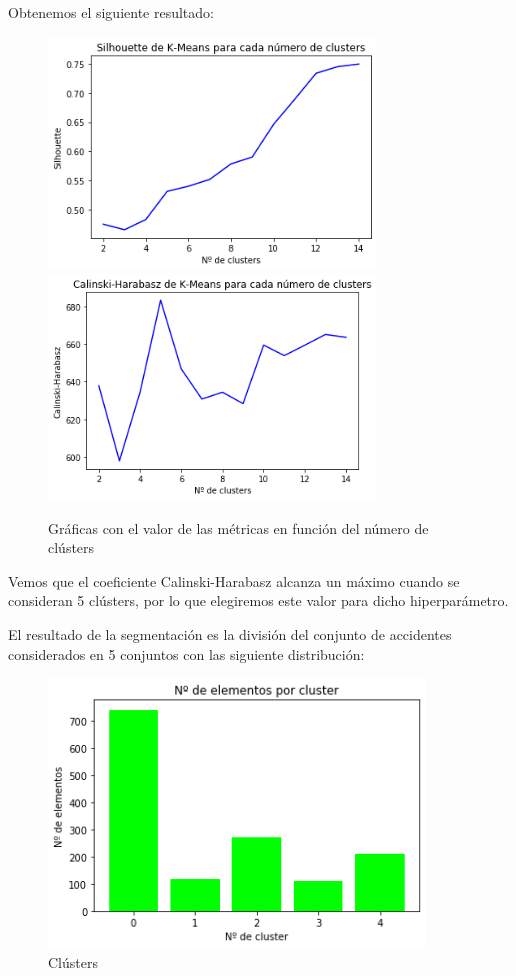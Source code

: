 \documentclass[a4]{article}
\begin{document}
Obtenemos el siguiente resultado:

\begin{figure}[H]
  \centering
  \caption{Gráficas con el valor de las métricas en función del número de clústers}
  \includegraphics[width=87mm]{imagenes/c1_kmeans_sil}
  \includegraphics[width=87mm]{imagenes/c1_kmeans_cal}
\end{figure}

Vemos que el coeficiente Calinski-Harabasz alcanza un máximo cuando se consideran 5 clústers, por lo que elegiremos este valor para dicho hiperparámetro.

El resultado de la segmentación es la división del conjunto de accidentes considerados en 5 conjuntos con las siguiente distribución:

\begin{figure}[H]
  \centering
  \caption{Clústers}
  \includegraphics[width=100mm]{imagenes/c1_kmeans_clusters}
\end{figure}
\end{document}

